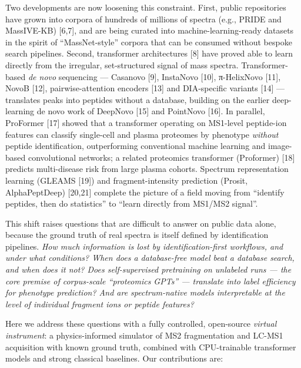 \documentclass[
]{article}
\begin{document}
Two developments are now loosening this constraint. First, public
repositories have grown into corpora of hundreds of millions of spectra
(e.g., PRIDE and MassIVE-KB) {[}6,7{]}, and are being curated into
machine-learning-ready datasets in the spirit of ``MassNet-style''
corpora that can be consumed without bespoke search pipelines. Second,
transformer architectures {[}8{]} have proved able to learn directly
from the irregular, set-structured signal of mass spectra.
Transformer-based \emph{de novo} sequencing --- Casanovo {[}9{]},
InstaNovo {[}10{]}, π-HelixNovo {[}11{]}, NovoB {[}12{]},
pairwise-attention encoders {[}13{]} and DIA-specific variants {[}14{]}
--- translates peaks into peptides without a database, building on the
earlier deep-learning de novo work of DeepNovo {[}15{]} and PointNovo
{[}16{]}. In parallel, ProFormer {[}17{]} showed that a transformer
operating on MS1-level peptide-ion features can classify single-cell and
plasma proteomes by phenotype \emph{without} peptide identification,
outperforming conventional machine learning and image-based
convolutional networks; a related proteomics transformer (Proformer)
{[}18{]} predicts multi-disease risk from large plasma cohorts. Spectrum
representation learning (GLEAMS {[}19{]}) and fragment-intensity
prediction (Prosit, AlphaPeptDeep) {[}20,21{]} complete the picture of a
field moving from ``identify peptides, then do statistics'' to ``learn
directly from MS1/MS2 signal''.

This shift raises questions that are difficult to answer on public data
alone, because the ground truth of real spectra is itself defined by
identification pipelines. \emph{How much information is lost by
identification-first workflows, and under what conditions? When does a
database-free model beat a database search, and when does it not? Does
self-supervised pretraining on unlabeled runs --- the core premise of
corpus-scale ``proteomics GPTs'' --- translate into label efficiency for
phenotype prediction? And are spectrum-native models interpretable at
the level of individual fragment ions or peptide features?}

Here we address these questions with a fully controlled, open-source
\emph{virtual instrument}: a physics-informed simulator of MS2
fragmentation and LC-MS1 acquisition with known ground truth, combined
with CPU-trainable transformer models and strong classical baselines.
Our contributions are:
\end{document}

